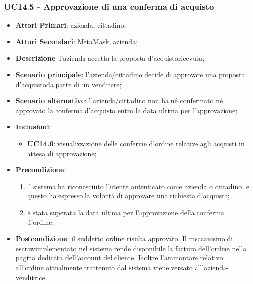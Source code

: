 \subsubsection{UC14.5 - Approvazione di una conferma di acquisto}
\begin{itemize}
	\item \textbf{Attori Primari}: azienda, cittadino;
	\item \textbf{Attori Secondari}: MetaMask\glo, azienda;
	\item \textbf{Descrizione}: l'azienda accetta la proposta d'acquisto\glosp ricevuta;
	\item \textbf{Scenario principale}: l'azienda/cittadino decide di approvare una proposta d'acquisto\glosp da parte di un venditore;
	\item \textbf{Scenario alternativo}: l'azienda/cittadino non ha né confermato né approvato la conferma d'acquisto entro la data ultima per l'approvazione;
		\item \textbf{Inclusioni}: 
	\begin{itemize}
		\item \textbf{UC14.6}:  visualizzazione delle conferme d'ordine\glosp 
		relative agli acquisti in attesa di approvazione;
	\end{itemize}
	\item \textbf{Precondizione}: 
	\begin{enumerate}[label=\alph*.]
		\item il sistema ha riconosciuto l'utente autenticato come azienda o cittadino, e questo ha espresso la volontà di approvare una richiesta d'acquisto;
		\item è stata superata la data ultima per l'approvazione della conferma d'ordine\glo;
	\end{enumerate}
	\item \textbf{Postcondizione}: il suddetto ordine risulta approvato. Il meccanismo di escrow\glosp implementato nel sistema rende disponibile la fattura dell'ordine nella pagina dedicata dell'account del cliente. Inoltre l'ammontare relativo all'ordine attualmente trattenuto dal sistema viene versato all'azienda-venditrice.
\end{itemize}


